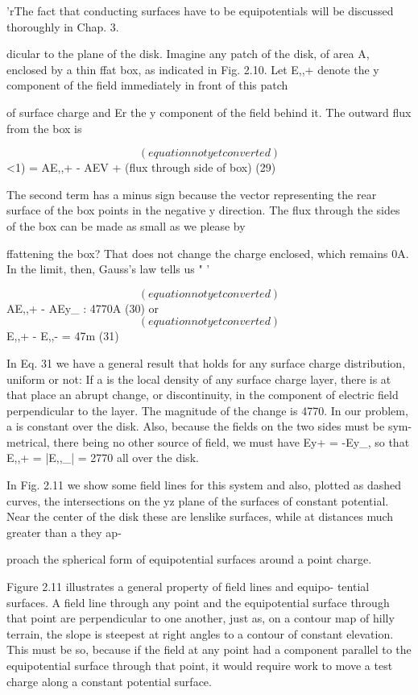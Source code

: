 'rThe fact that conducting surfaces have to be equipotentials will be discussed
thoroughly in Chap. 3.

dicular to the plane of the disk. Imagine any patch of the disk, of
area A, enclosed by a thin ffat box, as indicated in Fig. 2.10. Let E,,+
denote the y component of the field immediately in front of this patch

of surface charge and Er the y component of the field behind it. The
outward flux from the box is

\begin{equation}
(equation not yet converted)
\end{equation}
<1) = AE,,+ - AEV + (flux through side of box) (29)

The second term has a minus sign because the vector representing the
rear surface of the box points in the negative y direction. The flux
through the sides of the box can be made as small as we please by

ffattening the box? That does not change the charge enclosed, which
remains 0A. In the limit, then, Gauss's law tells us " '

\begin{equation}
(equation not yet converted)
\end{equation}
AE,,+ - AEy_ : 4770A (30)
or
\begin{equation}
(equation not yet converted)
\end{equation}
E,,+ - E,,- = 47m (31)

In Eq. 31 we have a general result that holds for any surface charge
distribution, uniform or not: If a is the local density of any surface
charge layer, there is at that place an abrupt change, or discontinuity,
in the component of electric field perpendicular to the layer. The
magnitude of the change is 4770. In our problem, a is constant over
the disk. Also, because the fields on the two sides must be sym-
metrical, there being no other source of field, we must have
Ey+ = -Ey_, so that E,,+ = |E,,_| = 2770 all over the disk.

In Fig. 2.11 we show some field lines for this system and also,
plotted as dashed curves, the intersections on the yz plane of the surfaces
of constant potential. Near the center of the disk these are
lenslike surfaces, while at distances much greater than a they ap-

proach the spherical form of equipotential surfaces around a point
charge.

Figure 2.11 illustrates a general property of field lines and equipo-
tential surfaces. A field line through any point and the equipotential
surface through that point are perpendicular to one another, just as,
on a contour map of hilly terrain, the slope is steepest at right angles
to a contour of constant elevation. This must be so, because if the
field at any point had a component parallel to the equipotential surface
through that point, it would require work to move a test charge
along a constant potential surface.

